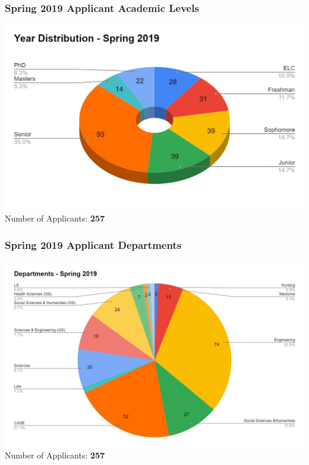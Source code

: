       \begin{frame}
        \frametitle{Spring 2019 Applicant Academic Levels}
        \centering
        \includegraphics[height=0.75\textheight]{images/year_distribution_spr2019.jpg}
        \LARGE
        \\
        Number of Applicants: \textbf{257}
      \end{frame}

      \begin{frame}
        \frametitle{Spring 2019 Applicant Departments}
        \centering
        \includegraphics[height=0.75\textheight]{images/departments_spr2019.jpg}
        \LARGE
        \\
        Number of Applicants: \textbf{257}
      \end{frame}

